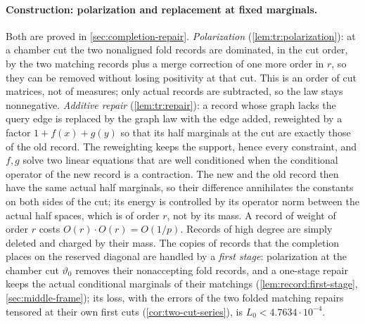 \paragraph{Construction: polarization and replacement at fixed marginals.}
Both are proved in \cref{sec:completion-repair}.
\emph{Polarization} (\cref{lem:tr:polarization}): at a chamber cut the two
nonaligned fold records are dominated, in the cut order, by the two matching
records plus a merge correction of one more order in $r$, so they can be
removed without losing positivity at that cut. This is an order of cut
matrices, not of measures; only actual records are subtracted, so the law
stays nonnegative. \emph{Additive repair} (\cref{lem:tr:repair}): a record whose
graph lacks the query edge is replaced by the graph law with the edge added,
reweighted by a factor $1+f(x)+g(y)$ so that its half marginals at the cut are
exactly those of the old record. The reweighting keeps the support, hence
every constraint, and $f,g$ solve two linear equations that are well
conditioned when the conditional operator of the new record is a contraction.
The new and the old record then have the same actual half marginals, so their
difference annihilates the constants on both sides of the cut; its energy is
controlled by its operator norm between the actual half spaces, which is of
order $r$, not by its mass. A record of weight of order $r$ costs
$O(r)\cdot O(r)=O(1/p)$. Records of high degree are simply deleted and charged
by their mass. The copies of records that the completion places on the
reserved diagonal are handled by a \emph{first stage}: polarization at the
chamber cut $\vartheta_0$ removes their nonaccepting fold records, and a
one-stage repair keeps the actual conditional marginals of their matchings
(\cref{lem:record:first-stage}, \cref{sec:middle-frame}); its loss, with the
errors of the two folded matching repairs tensored at their own first cuts
(\cref{cor:two-cut-series}), is $L_0<4.7634\cdot10^{-4}$.

